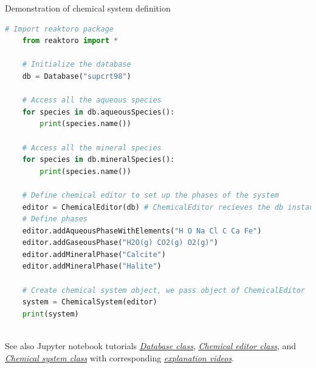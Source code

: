 %
%
\begin{frame}{Demonstration of chemical system definition}
	
\begin{lstlisting}[language=Python, caption=System definition]
	# Import reaktoro package
	from reaktoro import *
	
	# Initialize the database 
	db = Database("supcrt98")
	
	# Access all the aqueous species
	for species in db.aqueousSpecies():
		print(species.name())
	
	# Access all the mineral species
	for species in db.mineralSpecies():
		print(species.name())
	
	# Define chemical editor to set up the phases of the system 
	editor = ChemicalEditor(db) # ChemicalEditor recieves the db instance
	# Define phases
	editor.addAqueousPhaseWithElements("H O Na Cl C Ca Fe")
	editor.addGaseousPhase("H2O(g) CO2(g) O2(g)")
	editor.addMineralPhase("Calcite")
	editor.addMineralPhase("Halite")
	
	# Create chemical system object, we pass object of ChemicalEditor
	system = ChemicalSystem(editor)
	print(system)
	
\end{lstlisting}
See also Jupyter notebook tutorials 
%
\href{https://github.com/mtsveta/reaktoro-jupyter/blob/geofluids-examples/tutorial/cl.database.ipynb}{\textcolor{indigo(dye)}{\it Database class}}, %
\href{https://github.com/mtsveta/reaktoro-jupyter/blob/geofluids-examples/tutorial/cl.chemical-editor.ipynb}{\textcolor{indigo(dye)}{\it Chemical editor class}}, and 
 \href{https://github.com/mtsveta/reaktoro-jupyter/blob/geofluids-examples/tutorial/cl.chemical-system.ipynb}{\textcolor{indigo(dye)}{\it Chemical system class}} with corresponding  \href{https://polybox.ethz.ch/index.php/s/qStBnxUnry648U5}{\textcolor{indigo(dye)}{\it explanation videos}}.  %
\end{frame}


